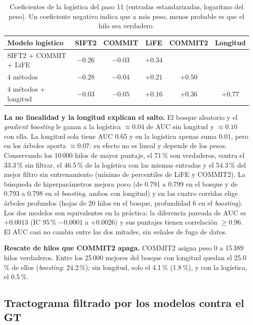 \documentclass[11pt,a4paper]{article}
\begin{document}
\begin{table}[H]
\centering
\small
\begin{tabular}{@{}lccccc@{}}
\toprule
\textbf{Modelo log\'istico} & \textbf{SIFT2} & \textbf{COMMIT} & \textbf{LiFE} & \textbf{COMMIT2} & \textbf{Longitud}\\
\midrule
SIFT2 + COMMIT + LiFE   & $-0.26$ & $-0.03$ & $+0.34$ & & \\
4 m\'etodos             & $-0.28$ & $-0.04$ & $+0.21$ & $+0.50$ & \\
4 m\'etodos + longitud  & $-0.03$ & $-0.05$ & $+0.16$ & $+0.36$ & $+0.77$\\
\bottomrule
\end{tabular}
\caption{Coeficientes de la log\'istica del paso 11 (entradas estandarizadas, logaritmo del
peso). Un coeficiente negativo indica que a m\'as peso, menos probable es que el hilo sea
verdadero.}
\label{tab:coef}
\end{table}

\textbf{La no linealidad y la longitud explican el salto.} El bosque aleatorio y el
\textit{gradient boosting} le ganan a la log\'istica $\approx0.04$ de AUC sin longitud y
$\approx0.10$ con ella. La longitud sola tiene AUC 0.65 y en la log\'istica apenas suma
0.01, pero en los \'arboles aporta $\approx0.07$: su efecto no es lineal y depende de los
pesos. Conservando los 10\,000 hilos de mayor puntaje, el 71\,\% son verdaderos, contra el
33.3\,\% sin filtrar, el 46.5\,\% de la log\'istica con las mismas entradas y el 54.3\,\% del mejor filtro sin
entrenamiento (m\'inimo de percentiles de LiFE y COMMIT2). La b\'usqueda de
hiperpar\'ametros mejora poco (de 0.791 a 0.799 en el bosque y de 0.793 a 0.798 en el
\textit{boosting}, ambos con longitud) y en las cuatro corridas elige \'arboles profundos
(hojas de 20 hilos en el bosque, profundidad 6 en el \textit{boosting}). Los dos modelos
son equivalentes en la pr\'actica: la diferencia pareada de AUC es $+0.0013$ (IC 95\,\%
$-0.0001$ a $+0.0026$) y sus puntajes tienen correlaci\'on $\ge0.96$. El AUC casi no cambia
entre las dos mitades, sin se\~nales de fuga de datos.

\textbf{Rescate de hilos que COMMIT2 apaga.} COMMIT2 asigna peso 0 a 15\,389 hilos
verdaderos. Entre los 25\,000 mejores del bosque con longitud quedan el 25.0\,\% de ellos
(\textit{boosting}: 24.2\,\%); sin longitud, solo el 4.1\,\% (1.8\,\%), y con la log\'istica,
el 0.5\,\%.

\subsection{Tractograma filtrado por los modelos contra el GT}
\label{sec:modelos-haces}
\end{document}
